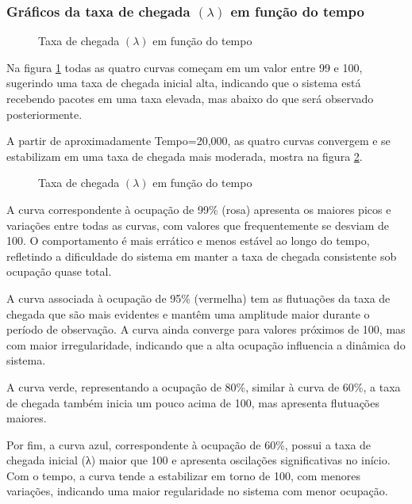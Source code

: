 \subsubsection{Gráficos da taxa de chegada $(\lambda)$ em função do tempo}
\begin{figure}[h!]
   \centering
   
   \caption{Taxa de chegada $(\lambda)$ em função do tempo}
   \label{fig:lambdaE1}
\end{figure}
Na figura \ref{fig:lambdaE1} todas as quatro curvas começam em um valor entre 99 e 100, sugerindo uma taxa de chegada inicial alta, indicando que o sistema está recebendo pacotes em uma taxa elevada, mas abaixo do que será observado posteriormente.

A partir de aproximadamente Tempo=20,000, as quatro curvas convergem e se estabilizam em uma taxa de chegada mais moderada, mostra na figura \ref{fig:lambda2E1}.
\begin{figure}[h!]
   \centering
   
   \caption{Taxa de chegada $(\lambda)$ em função do tempo}
   \label{fig:lambda2E1}
\end{figure}

A curva correspondente à ocupação de 99\% (rosa) apresenta os maiores picos e variações entre todas as curvas, com valores que frequentemente se desviam de 100. O comportamento é mais errático e menos estável ao longo do tempo, refletindo a dificuldade do sistema em manter a taxa de chegada consistente sob ocupação quase total.

A curva associada à ocupação de 95\% (vermelha) tem as flutuações da taxa de chegada que são mais evidentes e mantêm uma amplitude maior durante o período de observação. A curva ainda converge para valores próximos de 100, mas com maior irregularidade, indicando que a alta ocupação influencia a dinâmica do sistema.

A curva verde, representando a ocupação de 80\%, similar à curva de 60\%, a taxa de chegada também inicia um pouco acima de 100, mas apresenta flutuações maiores.

Por fim, a curva azul, correspondente à ocupação de 60\%, possui a taxa de chegada inicial (λ) maior que 100 e apresenta oscilações significativas no início. Com o tempo, a curva tende a estabilizar em torno de 100, com menores variações, indicando uma maior regularidade no sistema com menor ocupação.



